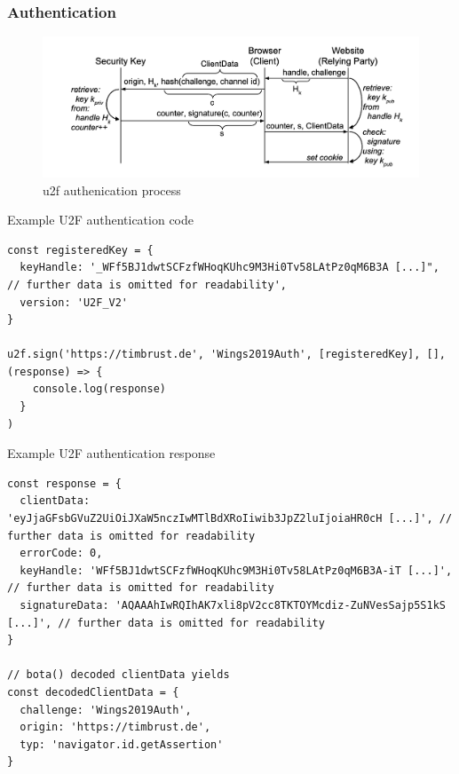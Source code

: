 \subsubsection{Authentication}

\begin{figure}[hbt]
	\centering
	\includegraphics[width=\textwidth]{pics/u2f_auth}
	\caption[\gls{u2f} authentication process]{\gls{u2f} authenication process\footnotemark}
	\label{fig:u2f_auth}
\end{figure}

\begin{example}{Example U2F authentication code}
\begin{verbatim}
const registeredKey = {
  keyHandle: '_WFf5BJ1dwtSCFzfWHoqKUhc9M3Hi0Tv58LAtPz0qM6B3A [...]", // further data is omitted for readability',
  version: 'U2F_V2'
}

u2f.sign('https://timbrust.de', 'Wings2019Auth', [registeredKey], [], (response) => {
    console.log(response)
  }
)
\end{verbatim}
\label{listing:u2f_auth}
\end{example}

\begin{example}{Example U2F authentication response}
\begin{verbatim}
const response = {
  clientData: 'eyJjaGFsbGVuZ2UiOiJXaW5nczIwMTlBdXRoIiwib3JpZ2luIjoiaHR0cH [...]', // further data is omitted for readability
  errorCode: 0,
  keyHandle: 'WFf5BJ1dwtSCFzfWHoqKUhc9M3Hi0Tv58LAtPz0qM6B3A-iT [...]', // further data is omitted for readability
  signatureData: 'AQAAAhIwRQIhAK7xli8pV2cc8TKTOYMcdiz-ZuNVesSajp5S1kS [...]', // further data is omitted for readability
}

// bota() decoded clientData yields
const decodedClientData = {
  challenge: 'Wings2019Auth',
  origin: 'https://timbrust.de',
  typ: 'navigator.id.getAssertion'
}
\end{verbatim}
\label{listing:u2f_auth_resp}
\end{example}

